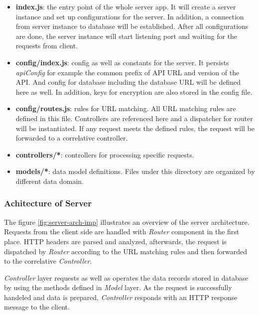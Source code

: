 \begin{itemize}
\item 
  \textbf{index.js}: the entry point of the whole server app. It will create a server instance and set up configurations for the server. In addition, a connection from server instance to database will be established. After all configurations are done, the server instance will start listening port and waiting for the requests from client.
\item
  \textbf{config/index.js}: config as well as constants for the server. It persists \textit{apiConfig} for example the common prefix of API URL and version of the API. And config for database including the database URL will be defined here as well. In addition, keys for encryption are also stored in the config file.
\item
  \textbf{config/routes.js}: rules for URL matching. All URL matching rules are defined in this file. Controllers are referenced here and a dispatcher for router will be instantiated. If any request meets the defined rules, the request will be forwarded to a correlative controller. 
\item
  \textbf{controllers/*}: controllers for processing specific requests.
\item 
  \textbf{models/*}: data model definitions. Files under this directory are organized by different data domain.
\end{itemize}


\subsubsection{Achitecture of Server}

The figure \ref{fig:server-arch-imp} illustrates an overview of the server architecture. Requests from the client side are handled with \textit{Router} component in the first place. HTTP headers are parsed and analyzed, afterwards, the request is dispatched by \textit{Router} according to the URL matching rules and then forwarded to the correlative \textit{Controller}.

\textit{Controller} layer requests as well as operates the data records stored in database by using the methods defined in \textit{Model} layer. As the request is successfully handeled and data is prepared, \textit{Controller} responds with an HTTP response message to the client.


